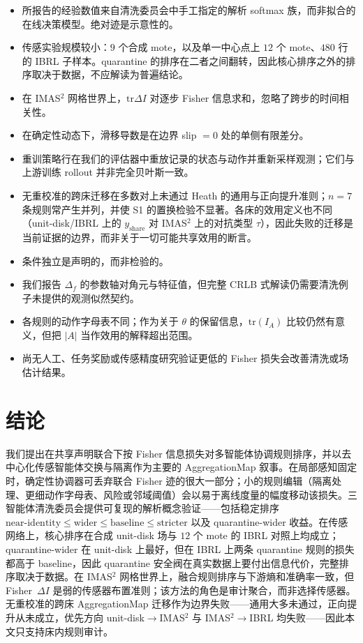 \documentclass[11pt,a4paper]{article}
\begin{document}
\begin{itemize}
  \item 所报告的经验数值来自清洗委员会中手工指定的解析 softmax 族，而非拟合的在线决策模型。绝对迹是示意性的。
  \item 传感实验规模较小：$9$ 个合成 mote，以及单一中心点上 $12$ 个 mote、$480$ 行的 IBRL 子样本。quarantine 的排序在二者之间翻转，因此核心排序之外的排序取决于数据，不应解读为普遍结论。
  \item 在 IMAS$^2$ 网格世界上，$\mathrm{tr}\Delta I$ 对逐步 Fisher 信息求和，忽略了跨步的时间相关性。
  \item 在确定性动态下，滑移导数是在边界 slip $=0$ 处的单侧有限差分。
  \item 重训策略行在我们的评估器中重放记录的状态与动作并重新采样观测；它们与上游训练 rollout 并非完全贝叶斯一致。
  \item 无重校准的跨床迁移在多数对上未通过 Heath 的通用与正向提升准则；$n=7$ 条规则常产生并列，并使 S1 的置换检验不显著。各床的效用定义也不同（unit-disk/IBRL 上的 $y_{\mathrm{share}}$ 对 IMAS$^2$ 上的对抗类型 $\tau$），因此失败的迁移是当前证据的边界，而非关于一切可能共享效用的断言。
  \item 条件独立是声明的，而非检验的。
  \item 我们报告 $\Delta_f$ 的参数轴对角元与特征值，但完整 CRLB 式解读仍需要清洗例子未提供的观测似然契约。
  \item 各规则的动作字母表不同；作为关于 $\theta$ 的保留信息，$\mathrm{tr}(I_A)$ 比较仍然有意义，但把 $|A|$ 当作效用的解释超出范围。
  \item 尚无人工、任务奖励或传感精度研究验证更低的 Fisher 损失会改善清洗或场估计结果。
\end{itemize}

\section{结论}
\label{sec:conclusion}

我们提出在共享声明联合下按 Fisher 信息损失对多智能体协调规则排序，并以去中心化传感智能体交换与隔离作为主要的 AggregationMap 叙事。在局部感知固定时，确定性协调器可丢弃联合 Fisher 迹的很大一部分；小的规则编辑（隔离处理、更细动作字母表、风险或邻域阈值）会以易于离线度量的幅度移动该损失。三智能体清洗委员会提供可复现的解析概念验证——包括稳定排序
$\mathrm{near\text{-}identity}\le\mathrm{wider}\le\mathrm{baseline}
\le\mathrm{stricter}$
以及 quarantine-wider 收益。在传感网络上，核心排序在合成 unit-disk 场与 $12$ 个 mote 的 IBRL 对照上均成立；quarantine-wider 在 unit-disk 上最好，但在 IBRL 上两条 quarantine 规则的损失都高于 baseline，因此 quarantine 安全阀在真实数据上要付出信息代价，完整排序取决于数据。在 IMAS$^2$ 网格世界上，融合规则排序与下游熵和准确率一致，但 Fisher~$\Delta I$ 是弱的传感器布置准则；该方法的角色是审计聚合，而非选择传感器。无重校准的跨床 AggregationMap 迁移作为边界失败——通用大多未通过，正向提升从未成立，优先方向 unit-disk$\to$IMAS$^2$ 与 IMAS$^2\to$IBRL 均失败——因此本文只支持床内规则审计。
\end{document}
